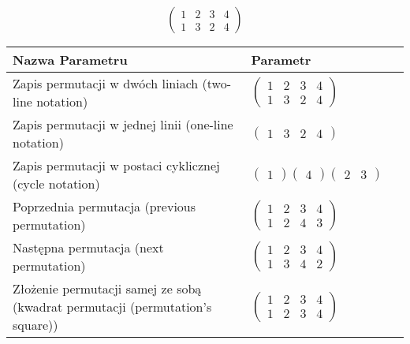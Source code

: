 \documentclass[12pt]{article}
\begin{document}
\subsection{}
\begin{center}
\[
\begin{pmatrix}
	1 & 2 & 3 & 4 \\ 
	1 & 3 & 2 & 4 
\end{pmatrix}
\]

\begin{tabular}{|m{0.6\linewidth}|m{0.4\linewidth}|}
	\hline
	Nazwa Parametru & Parametr \\
	\hline
	Zapis permutacji w dwóch liniach (two-line notation) & $\begin{pmatrix} 1 & 2 & 3 & 4 \\ 
1 & 3 & 2 & 4 \end{pmatrix}$ \\ 
	\hline
	Zapis permutacji w jednej linii (one-line notation) & $\begin{pmatrix} 1 & 3 & 2 & 4 \end{pmatrix}$ \\ 
	\hline
	Zapis permutacji w postaci cyklicznej (cycle notation) & $\begin{pmatrix} 1 \end{pmatrix} \begin{pmatrix} 4 \end{pmatrix} \begin{pmatrix} 2 & 3 \end{pmatrix} $ \\ 
	\hline
	Poprzednia permutacja (previous permutation) & $\begin{pmatrix} 1 & 2 & 3 & 4 \\ 
1 & 2 & 4 & 3 \end{pmatrix}$ \\ 
	\hline
	Następna permutacja (next permutation) & $\begin{pmatrix} 1 & 2 & 3 & 4 \\ 
1 & 3 & 4 & 2 \end{pmatrix}$ \\ 
	\hline
	Złożenie permutacji samej ze sobą (kwadrat permutacji (permutation's square)) & $\begin{pmatrix} 1 & 2 & 3 & 4 \\ 
1 & 2 & 3 & 4 \end{pmatrix}$ \\ 
	\hline
\end{tabular}
\end{center}
\end{document}
